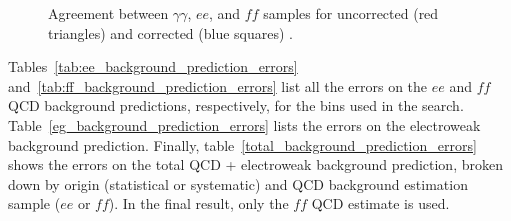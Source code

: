 \documentclass[dissertation.tex]{subfiles}
\begin{document}
\begin{figure}
	\hspace{1cm}
	\caption{Agreement between $\gamma\gamma$, $ee$, and $\mathit{ff}$ samples for uncorrected (red triangles) and corrected (blue squares) \MET.}
	\label{fig:Type-I_MET_corrections_vs_uncorrected_MET_zoom}
\end{figure}

Tables~\ref{tab:ee_background_prediction_errors} and~\ref{tab:ff_background_prediction_errors} list all the errors on the $ee$ and $\mathit{ff}$ QCD background predictions, respectively, for the \MET bins used in the search.  Table~\ref{eg_background_prediction_errors} lists the errors on the electroweak background prediction.  Finally, table~\ref{total_background_prediction_errors} shows the errors on the total QCD + electroweak background prediction, broken down by origin (statistical or systematic) and QCD background estimation sample ($ee$ or $\mathit{ff}$).  In the final result, only the $\mathit{ff}$ QCD estimate is used.
\end{document}
